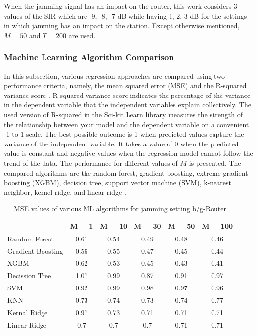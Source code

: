 When the jamming signal has an impact on the router, this work considers 3 values of the SIR which are -9, -8, -7 dB while having 1, 2, 3 dB for the settings in which jamming has an impact on the station. Except otherwise mentioned, $M = 50$ and $T = 200$ are used. 

\subsubsection{Machine Learning Algorithm Comparison}
In this subsection, various regression approaches are compared using two performance criteria, namely, the mean squared error (MSE) and the R-squared variance score \cite{r-squared}. R-squared variance score indicates the percentage of the variance in the dependent variable that the independent variables explain collectively. The used version of R-squared in the Sci-kit Learn library measures the strength of the relationship between your model and the dependent variable on a convenient -1 to 1 scale. The best possible outcome is 1 when predicted values capture the variance of the independent variable. It takes a value of 0 when the predicted value is constant and negative values when the regression model cannot follow the trend of the data. The performance for different values of $M$ is presented. The compared algorithms are the random forest, gradient boosting, extreme gradient boosting (XGBM), decision tree, support vector machine (SVM), k-nearest neighbor, kernel ridge, and linear ridge \cite{SCIKITLEARN,Chen:2016:XST:2939672.2939785}. %

\begin{table}[!ht]
	\centering
	\caption{MSE values of various ML algorithms for jamming setting b/g-Router}
	\begin{tabular}{|p{5.3em}|c|c|c|c|c|}
		\toprule
		& \multicolumn{1}{p{2.4em}|}{M = 1} & \multicolumn{1}{p{2.9em}|}{M = 10} & \multicolumn{1}{p{2.9em}|}{M = 30} & \multicolumn{1}{p{2.9em}|}{M = 50} & \multicolumn{1}{p{3.4em}|}{M = 100} \\
		\midrule
		Random Forest	 & 0.61  & 0.54  & 0.49  & 0.48  & 0.46 \\
		\midrule
		Gradient Boosting  & 0.56  & 0.55  & 0.47  & 0.45  & 0.44 \\
		\midrule
		XGBM  & 0.62  & 0.53  & 0.45  & 0.43  & 0.41 \\
		\midrule
		Decission Tree & 1.07  & 0.99  & 0.87  & 0.91  & 0.97 \\
		\midrule
		SVM   & 0.92  & 0.99  & 0.98  & 0.97  & 0.96 \\
		\midrule
		KNN   & 0.73  & 0.74  & 0.73  & 0.74  & 0.77 \\
		\midrule
		Kernal Ridge & 0.97  & 0.73  & 0.71  & 0.71  & 0.71 \\
		\midrule
		Linear Ridge & 0.7   & 0.7   & 0.7   & 0.71  & 0.71 \\
		\bottomrule
	\end{tabular}%
	\label{ftml-jrnl:tab:T1}%
\end{table}%

